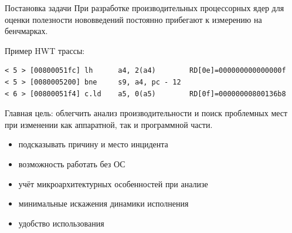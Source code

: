\documentclass[10pt,aspectratio=169,hyperref={pdftex,unicode},xcolor=dvipsnames]{beamer}
\begin{document}
\begin{frame}[fragile]{ Постановка задачи }
    При разработке производительных процессорных ядер для оценки полезности
    нововведений постоянно прибегают к измерению на бенчмарках.



    Пример HWT трассы:
\begin{verbatim}
< 5 > [00800051fc] lh      a4, 2(a4)        RD[0e]=000000000000000f
< 5 > [0080005200] bne     s9, a4, pc - 12
< 6 > [00800051f4] c.ld    a5, 0(a5)        RD[0f]=00000000800136b8
\end{verbatim}

    Главная цель: облегчить анализ производительности и поиск проблемных мест
    при изменении как аппаратной, так и программной части.


    \begin{itemize}
        \pause \item подсказывать причину и место инцидента
        \pause \item возможность работать без ОС
        \pause \item учёт микроархитектурных особенностей при анализе
        \pause \item минимальные искажения динамики исполнения
        \pause \item удобство использования
    \end{itemize}
\end{frame}
\end{document}

